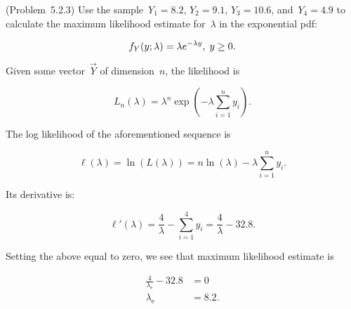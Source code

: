 \begin{problem}
  (\textnormal{Problem~5.2.3}) Use the sample~${Y_1 = 8.2}$, ${Y_2 = 9.1}$, ${Y_3 = 10.6}$, and~${Y_4 = 4.9}$ to calculate the maximum likelihood estimate for~$\lambda$ in the exponential pdf:

  \begin{equation}\label{eq:P02:Exponential}
    f_{Y}(y;\lambda) = \lambda e^{-\lambda y}, \hspace{0.1cm} y \geq 0 \text{.}
  \end{equation}
\end{problem}

Given some vector~$\vec{Y}$ of dimension~$n$, the likelihood is

\begin{equation}\label{eq:P02:Likelihood}
  L_{n}(\lambda) = \lambda^{n}\exp\left(-\lambda\sum_{i=1}^{n} y_{i}\right)\text{.}
\end{equation}

\noindent
The log likelihood of the aforementioned sequence is

\begin{equation}\label{eq:P02:LogLikelihood}
  \ell(\lambda) = \ln\left(L(\lambda)\right) = n\ln(\lambda) - \lambda \sum_{i=1}^{n} y_i\text{.}
\end{equation}

\noindent
Its derivative is:

\begin{equation}\label{eq:P02:LogLikelihood:Derivative}
  \ell'(\lambda) = \frac{4}{\lambda} - \sum_{i=1}^{4} y_i = \frac{4}{\lambda} - 32.8  \text{.}
\end{equation}

\noindent
Setting the above equal to zero, we see that maximum likelihood estimate is

\begin{align}
  \frac{4}{\lambda_{\text{e}}} - 32.8 &= 0 \\
  \lambda_{\text{e}} &= 8.2 \text{.}
\end{align}

